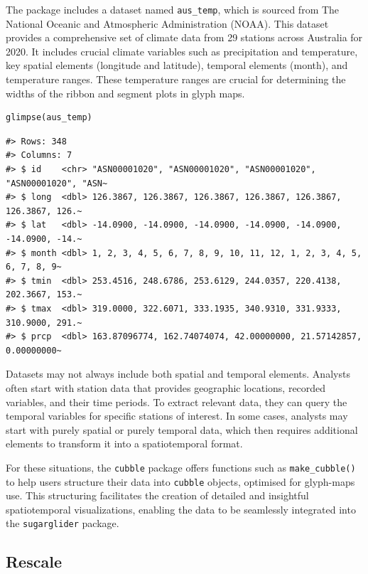 The package includes a dataset named \texttt{aus\_temp}, which is sourced from The National Oceanic and Atmospheric Administration (NOAA). This dataset provides a comprehensive set of climate data from 29 stations across Australia for 2020. It includes crucial climate variables such as precipitation and temperature, key spatial elements (longitude and latitude), temporal elements (month), and temperature ranges. These temperature ranges are crucial for determining the widths of the ribbon and segment plots in glyph maps.

\begin{verbatim}
glimpse(aus_temp)
\end{verbatim}

\begin{verbatim}
#> Rows: 348
#> Columns: 7
#> $ id    <chr> "ASN00001020", "ASN00001020", "ASN00001020", "ASN00001020", "ASN~
#> $ long  <dbl> 126.3867, 126.3867, 126.3867, 126.3867, 126.3867, 126.3867, 126.~
#> $ lat   <dbl> -14.0900, -14.0900, -14.0900, -14.0900, -14.0900, -14.0900, -14.~
#> $ month <dbl> 1, 2, 3, 4, 5, 6, 7, 8, 9, 10, 11, 12, 1, 2, 3, 4, 5, 6, 7, 8, 9~
#> $ tmin  <dbl> 253.4516, 248.6786, 253.6129, 244.0357, 220.4138, 202.3667, 153.~
#> $ tmax  <dbl> 319.0000, 322.6071, 333.1935, 340.9310, 331.9333, 310.9000, 291.~
#> $ prcp  <dbl> 163.87096774, 162.74074074, 42.00000000, 21.57142857, 0.00000000~
\end{verbatim}

Datasets may not always include both spatial and temporal elements. Analysts often start with station data that provides geographic locations, recorded variables, and their time periods. To extract relevant data, they can query the temporal variables for specific stations of interest. In some cases, analysts may start with purely spatial or purely temporal data, which then requires additional elements to transform it into a spatiotemporal format.

For these situations, the \texttt{cubble} package offers functions such as \texttt{make\_cubble()} to help users structure their data into \texttt{cubble} objects, optimised for glyph-maps use. This structuring facilitates the creation of detailed and insightful spatiotemporal visualizations, enabling the data to be seamlessly integrated into the \texttt{sugarglider} package.

\hypertarget{rescale}{%
\subsection{Rescale}\label{rescale}}

